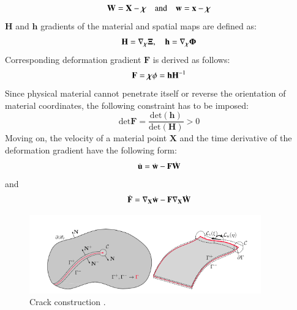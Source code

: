 \documentclass[11pt]{acmeArticle}
\numberwithin{equation}{section}
\begin{document}
\begin{equation}
\mathbf W = \mathbf X - { \boldsymbol {\rm \chi}} \quad \mathrm{and} \quad \mathbf w = \mathbf x - { \boldsymbol {\rm \chi}}
\end{equation}
$\mathbf H$ and $\mathbf h$  gradients of the material and spatial maps are defined as:
\begin{equation}
\mathbf H = \nabla_{\boldsymbol {\rm \chi}} {\boldsymbol {\rm \Xi}}, \quad \mathbf  h =   \nabla_{\boldsymbol {\rm \chi}} {\boldsymbol {\rm \Phi}}
\end{equation}
Corresponding deformation gradient $\mathbf F $ is derived as follows:
\begin{equation}
\mathbf F =  { \boldsymbol {\rm \chi}} \phi=\mathbf h \mathbf H^{-1}
\end{equation}
Since physical material cannot penetrate itself or reverse the orientation of material coordinates, the following constraint has to be imposed:
\begin{equation}
{\mathrm {det}} \mathbf {F} = \frac{\mathrm {det} (\mathbf h)}{\mathrm {det} (\mathbf H)} > 0
\end{equation}
Moving on, the velocity of a material point $\mathbf X$ and the time derivative of the deformation gradient have the following form:
\begin{equation}\label{eq:crack_disp}
{\dot {\boldsymbol {\rm u} } } = {\dot {\boldsymbol {\rm w} } } - \mathbf F{\dot {\boldsymbol {\rm W} } }
\end{equation}
and
\begin{equation}\label{eq:crack_def_grad}
{\dot {\boldsymbol {\rm F} } } = \nabla_{\mathbf X} {\dot {\boldsymbol {\rm w} } } - \mathbf F \nabla_{\mathbf X } {\dot {\boldsymbol {\rm W} } }
\end{equation}
\begin{figure}
	\begin{centering}
		\includegraphics[width=10cm]{Figures/frac_crack_con.png}
		\caption{Crack construction \citep{kaczmarczyk2017energy}.}
		\label{fig:frac_crack_con}
	\end{centering}
\end{figure}
\end{document}
